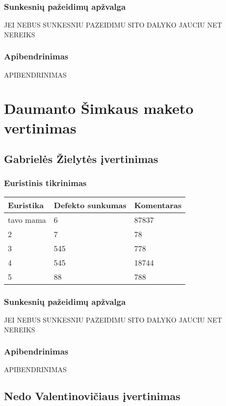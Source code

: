 \documentclass{VUMIFPSkursinis}
\begin{document}
\subsubsection{Sunkesnių pažeidimų apžvalga}
JEI NEBUS SUNKESNIU PAZEIDIMU SITO DALYKO JAUCIU NET NEREIKS

\subsubsection{Apibendrinimas}
APIBENDRINIMAS

\section{Daumanto Šimkaus maketo vertinimas}
\subsection{Gabrielės Žielytės įvertinimas}
\subsubsection{Euristinis tikrinimas}
\begin{center}
 \begin{tabular}{|| p{4cm} | p{4cm} | p{8cm} ||} 
 \hline
 Euristika & Defekto sunkumas & Komentaras \\
 \hline\hline
 tavo mama & 6 & 87837 \\ 
 \hline
 2 & 7 & 78 \\
 \hline
 3 & 545 & 778 \\
 \hline
 4 & 545 & 18744 \\
 \hline
 5 & 88 & 788 \\  %
 \hline                 %
\end{tabular}	
\end{center}

\subsubsection{Sunkesnių pažeidimų apžvalga}
JEI NEBUS SUNKESNIU PAZEIDIMU SITO DALYKO JAUCIU NET NEREIKS

\subsubsection{Apibendrinimas}
APIBENDRINIMAS

\subsection{Nedo Valentinovičiaus įvertinimas}
\end{document}
